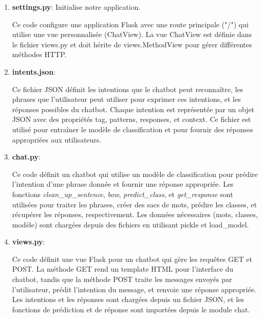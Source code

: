 \documentclass[a4paper,11pt]{article}
\begin{document}
            \begin{enumerate}
                \item \textbf{settings.py}: Initialise notre application. 
                    
                    \noindent Ce code configure une application Flask avec une route principale ("/") 
                    qui utilise une vue personnalisée (ChatView). La vue ChatView est définie dans le fichier views.py et doit hérite de views.MethodView pour gérer différentes méthodes HTTP.
                
                \item \textbf{intents.json}:
                    
                    \noindent Ce fichier JSON définit les intentions que le chatbot peut reconnaître, les phrases que l'utilisateur peut utiliser 
                    pour exprimer ces intentions, et les réponses possibles du chatbot. Chaque intention est représentée par un objet JSON avec des propriétés tag, 
                    patterns, responses, et context. Ce fichier est utilisé pour entraîner le modèle de classification et pour fournir des réponses appropriées aux utilisateurs.
                
                    \item \textbf{chat.py}:
                    
                    \noindent Ce code définit un chatbot qui utilise un modèle de classification pour prédire l'intention d'une phrase donnée et 
                    fournir une réponse appropriée. Les fonctions \textit{clean\_up\_sentence}, \textit{bow}, \textit{predict\_class}, et \textit{get\_response} sont utilisées pour 
                    traiter les phrases, créer des sacs de mots, prédire les classes, et récupérer les réponses, respectivement. Les données nécessaires 
                    (mots, classes, modèle) sont chargées depuis des fichiers en utilisant pickle et load\_model.

                \newpage
                \item \textbf{views.py}:
                    
                    \noindent Ce code définit une vue Flask pour un chatbot qui gère les requêtes GET et POST. 
                    La méthode GET rend un template HTML pour l'interface du chatbot, tandis que la méthode POST traite 
                    les messages envoyés par l'utilisateur, prédit l'intention du message, et renvoie une réponse appropriée. Les intentions et 
                    les réponses sont chargées depuis un fichier JSON, et les fonctions de prédiction et de réponse sont importées depuis le module chat.


\end{enumerate}
\end{document}
